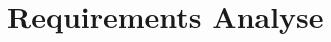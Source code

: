 \part{Requirements Analyse}\label{prt:Requirements}



%
%
%
%
%
%
%
% 
% 
% 
% 
% 
% 
% 
%
%
% 
% 
%


\ctparttext{}


\cleardoublepage %


%
%
%
%
%
%
%

